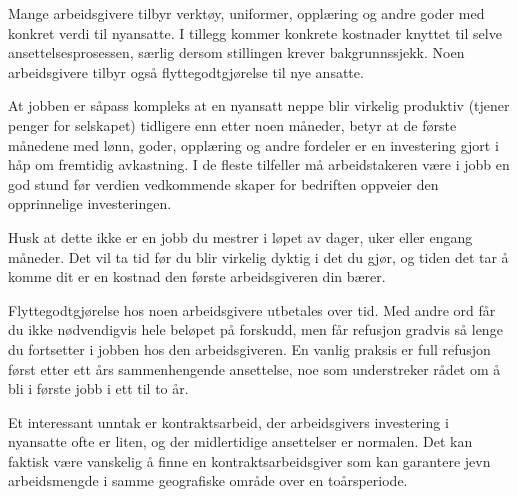 Mange arbeidsgivere tilbyr verktøy, uniformer, opplæring og andre goder med konkret verdi til nyansatte. I tillegg kommer konkrete kostnader knyttet til selve ansettelsesprosessen, særlig dersom stillingen krever bakgrunnssjekk. Noen arbeidsgivere tilbyr også flyttegodtgjørelse til nye ansatte.

At jobben er såpass kompleks at en nyansatt neppe blir virkelig produktiv (tjener penger for selskapet) tidligere enn etter noen måneder, betyr at de første månedene med lønn, goder, opplæring og andre fordeler er en investering gjort i håp om fremtidig avkastning. I de fleste tilfeller må arbeidstakeren være i jobb en god stund før verdien vedkommende skaper for bedriften oppveier den opprinnelige investeringen.

Husk at dette ikke er en jobb du mestrer i løpet av dager, uker eller engang måneder. Det vil ta tid før du blir virkelig dyktig i det du gjør, og tiden det tar å komme dit er en kostnad den første arbeidsgiveren din bærer.

Flyttegodtgjørelse hos noen arbeidsgivere utbetales over tid. Med andre ord får du ikke nødvendigvis hele beløpet på forskudd, men får refusjon gradvis så lenge du fortsetter i jobben hos den arbeidsgiveren. En vanlig praksis er full refusjon først etter ett års sammenhengende ansettelse, noe som understreker rådet om å bli i første jobb i ett til to år.

\vskip 10pt

Et interessant unntak er kontraktsarbeid, der arbeidsgivers investering i nyansatte ofte er liten, og der midlertidige ansettelser er normalen. Det kan faktisk være vanskelig å finne en kontraktsarbeidsgiver som kan garantere jevn arbeidsmengde i samme geografiske område over en toårsperiode.
 



